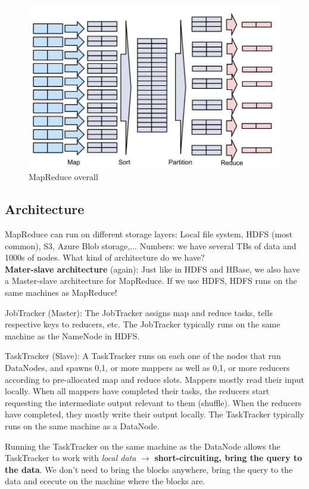 \documentclass[11pt,oneside,a4paper]{article}
\begin{document}
\begin{figure}[t!]
	\centering
	\includegraphics[width=0.4\linewidth]{figures/mr_overall}
	\caption{MapReduce overall}
	\label{fig:mroverall}
\end{figure}

\subsection{Architecture}

MapReduce can run on different storage layers: Local file system, HDFS (most common), S3, Azure Blob storage,... Numbers: we have several TBs of data and 1000s of nodes. What kind of architecture do we have?\\

\textbf{Mater-slave architecture} (again): Just like in HDFS and HBase, we also have a Master-slave architecture for MapReduce. If we use HDFS, HDFS runs on the same machines as MapReduce!
\begin{compactitem}
\item JobTracker (Master): The JobTracker assigns map and reduce tasks, tells respective keys to reducers, etc. The JobTracker typically runs on the same machine as the NameNode in HDFS.

\item TaskTracker (Slave): A TaskTracker runs on each one of the nodes that run DataNodes, and spawns 0,1, or more mappers as well as 0,1, or more reducers according to pre-allocated map and reduce slots. Mappers mostly read their input locally. When all mappers have completed their tasks, the reducers start requesting the intermediate output relevant to them (shuffle). When the reducers have completed, they mostly write their output locally. The TaskTracker typically runs on the same machine as a DataNode.
\end{compactitem}

Running the TaskTracker on the same machine as the DataNode allows the TaskTracker to work with \textit{local data} $\rightarrow$ \textbf{short-circuiting, bring the query to the data}. We don't need to bring the blocks anywhere, bring the query to the data and ececute on the machine where the blocks are.\\
\end{document}
